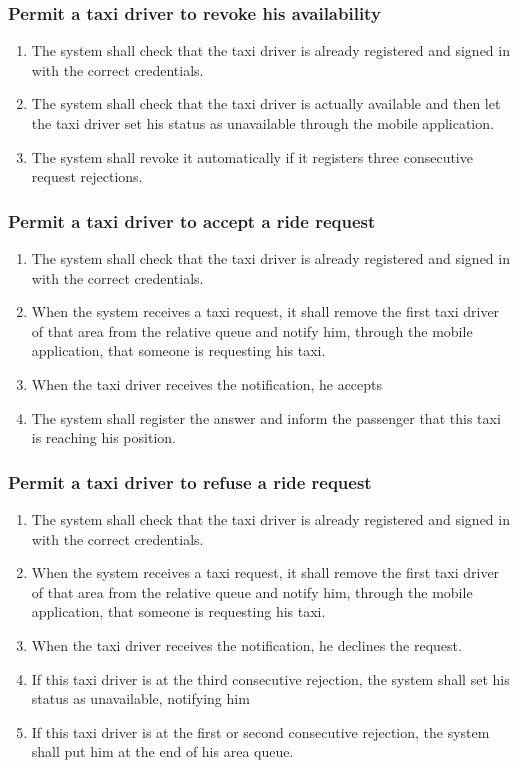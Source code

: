 		\subsubsection{Permit a taxi driver to revoke his availability}
			\begin{enumerate}[label=\bfseries R\arabic*:]
				\item The system shall check that the taxi driver is already registered and signed in with
				the correct	credentials.
				\item The system shall check that the taxi driver is actually available and then
				let the taxi driver set his status as unavailable through the mobile application.
				\item The system shall revoke it automatically if it registers three consecutive request
				rejections.
			\end{enumerate}
		\subsubsection{Permit a taxi driver to accept a ride request}
			\begin{enumerate}[label=\bfseries R\arabic*:]
				\item The system shall check that the taxi driver is already registered and signed in with
				the correct	credentials.
				\item When the system receives a taxi request, it shall remove the first taxi driver
				of that area from the relative queue and notify him, through the mobile application,
				that someone is requesting his taxi.
				\item When the taxi driver receives the notification, he accepts
				\item The system shall register the answer and inform the passenger
				that this taxi is reaching his position.
			\end{enumerate}
		\subsubsection{Permit a taxi driver to refuse a ride request}
			\begin{enumerate}[label=\bfseries R\arabic*:]
				\item The system shall check that the taxi driver is already registered and signed in with
				the correct	credentials.
				\item When the system receives a taxi request, it shall remove the first taxi driver
				of that area from the relative queue and notify him, through the mobile application,
				that someone is requesting his taxi.
				\item When the taxi driver receives the notification, he declines the request.
				\item If this taxi driver is at the third consecutive rejection, the system shall set his status as unavailable,
				notifying him
				\item If this taxi driver is at the first or second consecutive rejection, the system shall put him
				at the end of his area queue.
			\end{enumerate}
